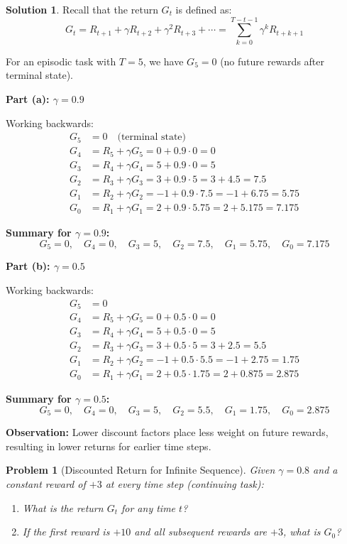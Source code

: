 \documentclass[11pt]{article}
\newtheorem{problem}{Problem}
\theoremstyle{definition}
\newtheorem*{solution}{Solution}
\begin{document}
\begin{solution}
Recall that the return $G_t$ is defined as:
\[
G_t = R_{t+1} + \gamma R_{t+2} + \gamma^2 R_{t+3} + \cdots = \sum_{k=0}^{T-t-1} \gamma^k R_{t+k+1}
\]

For an episodic task with $T = 5$, we have $G_5 = 0$ (no future rewards after terminal state).

\textbf{Part (a): $\gamma = 0.9$}

Working backwards:
\begin{align*}
G_5 &= 0 \quad \text{(terminal state)} \\
G_4 &= R_5 + \gamma G_5 = 0 + 0.9 \cdot 0 = 0 \\
G_3 &= R_4 + \gamma G_4 = 5 + 0.9 \cdot 0 = 5 \\
G_2 &= R_3 + \gamma G_3 = 3 + 0.9 \cdot 5 = 3 + 4.5 = 7.5 \\
G_1 &= R_2 + \gamma G_2 = -1 + 0.9 \cdot 7.5 = -1 + 6.75 = 5.75 \\
G_0 &= R_1 + \gamma G_1 = 2 + 0.9 \cdot 5.75 = 2 + 5.175 = 7.175
\end{align*}

\textbf{Summary for $\gamma = 0.9$:}
\[
\boxed{G_5 = 0, \quad G_4 = 0, \quad G_3 = 5, \quad G_2 = 7.5, \quad G_1 = 5.75, \quad G_0 = 7.175}
\]

\textbf{Part (b): $\gamma = 0.5$}

Working backwards:
\begin{align*}
G_5 &= 0 \\
G_4 &= R_5 + \gamma G_5 = 0 + 0.5 \cdot 0 = 0 \\
G_3 &= R_4 + \gamma G_4 = 5 + 0.5 \cdot 0 = 5 \\
G_2 &= R_3 + \gamma G_3 = 3 + 0.5 \cdot 5 = 3 + 2.5 = 5.5 \\
G_1 &= R_2 + \gamma G_2 = -1 + 0.5 \cdot 5.5 = -1 + 2.75 = 1.75 \\
G_0 &= R_1 + \gamma G_1 = 2 + 0.5 \cdot 1.75 = 2 + 0.875 = 2.875
\end{align*}

\textbf{Summary for $\gamma = 0.5$:}
\[
\boxed{G_5 = 0, \quad G_4 = 0, \quad G_3 = 5, \quad G_2 = 5.5, \quad G_1 = 1.75, \quad G_0 = 2.875}
\]

\textbf{Observation:} Lower discount factors place less weight on future rewards, resulting in lower returns for earlier time steps.
\end{solution}

\newpage

\begin{problem}[Discounted Return for Infinite Sequence]
Given $\gamma = 0.8$ and a constant reward of $+3$ at every time step (continuing task):
\begin{enumerate}[label=(\alph*)]
    \item What is the return $G_t$ for any time $t$?
    \item If the first reward is $+10$ and all subsequent rewards are $+3$, what is $G_0$?
\end{enumerate}
\end{problem}
\end{document}
